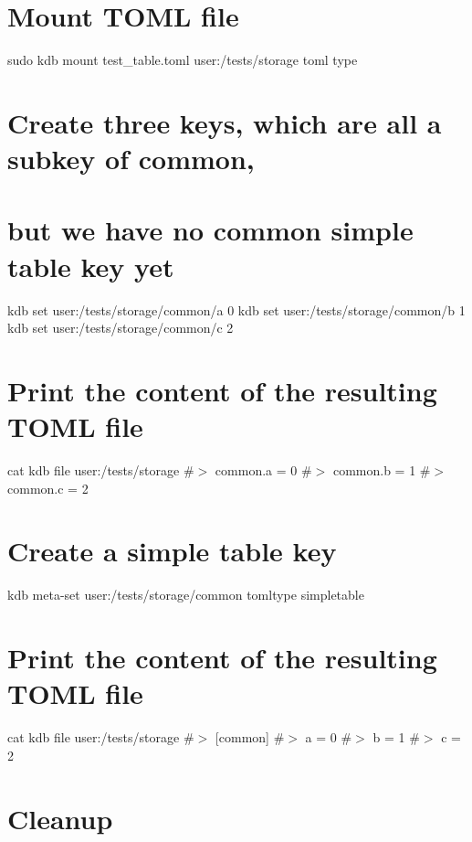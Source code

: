  \hypertarget{autotoc_md642_autotoc_md706}{}\section{Mount T\+O\+M\+L file}\label{autotoc_md642_autotoc_md706}
sudo kdb mount test\+\_\+table.\+toml user\+:/tests/storage toml type\hypertarget{autotoc_md642_autotoc_md707}{}\section{Create three keys, which are all a subkey of \textquotesingle{}common\textquotesingle{},}\label{autotoc_md642_autotoc_md707}
\hypertarget{autotoc_md642_autotoc_md708}{}\section{but we have no \textquotesingle{}common\textquotesingle{} simple table key yet}\label{autotoc_md642_autotoc_md708}
kdb set \textquotesingle{}user\+:/tests/storage/common/a\textquotesingle{} \textquotesingle{}0\textquotesingle{} kdb set \textquotesingle{}user\+:/tests/storage/common/b\textquotesingle{} \textquotesingle{}1\textquotesingle{} kdb set \textquotesingle{}user\+:/tests/storage/common/c\textquotesingle{} \textquotesingle{}2\textquotesingle{}\hypertarget{autotoc_md642_autotoc_md709}{}\section{Print the content of the resulting T\+O\+M\+L file}\label{autotoc_md642_autotoc_md709}
cat {\ttfamily kdb file user\+:/tests/storage} \#$>$ common.\+a = 0 \#$>$ common.\+b = 1 \#$>$ common.\+c = 2\hypertarget{autotoc_md642_autotoc_md710}{}\section{Create a simple table key}\label{autotoc_md642_autotoc_md710}
kdb meta-\/set \textquotesingle{}user\+:/tests/storage/common\textquotesingle{} \textquotesingle{}tomltype\textquotesingle{} \textquotesingle{}simpletable\textquotesingle{}\hypertarget{autotoc_md642_autotoc_md711}{}\section{Print the content of the resulting T\+O\+M\+L file}\label{autotoc_md642_autotoc_md711}
cat {\ttfamily kdb file user\+:/tests/storage} \#$>$ \mbox{[}common\mbox{]} \#$>$ a = 0 \#$>$ b = 1 \#$>$ c = 2\hypertarget{autotoc_md642_autotoc_md712}{}\section{Cleanup}\label{autotoc_md642_autotoc_md712}
